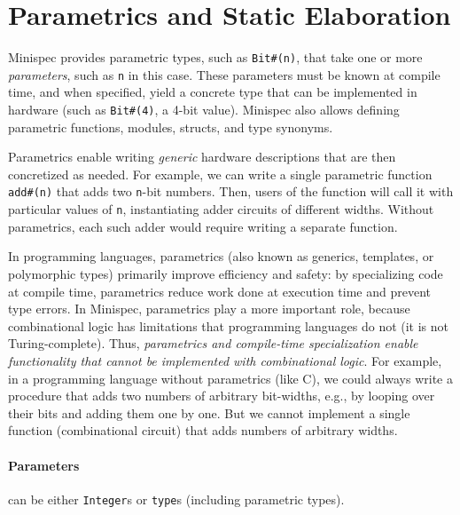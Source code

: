 \section{Parametrics and Static Elaboration}
\label{sec:parametrics}

Minispec provides parametric types, such as \texttt{Bit\#(n)},
that take one or more \emph{parameters}, such as \texttt{n} in this case.
These parameters must be known at compile time, and when specified,
yield a concrete type that can be implemented in hardware (such as \texttt{Bit\#(4)}, a 4-bit value).
Minispec also allows defining parametric functions, modules, structs, and type synonyms.

Parametrics enable writing \emph{generic} hardware descriptions
that are then concretized as needed. For example,
we can write a single parametric function \texttt{add\#(n)}
that adds two \texttt{n}-bit numbers.
Then, users of the function will call it with particular values of \texttt{n},
instantiating adder circuits of different widths.
Without parametrics, each such adder would require writing a separate function.

In programming languages, parametrics (also known as generics, templates, or polymorphic types)
primarily improve efficiency and safety: by specializing code at compile time,
parametrics reduce work done at execution time and prevent type errors.
In Minispec, parametrics play a more important role,
because combinational logic has limitations that programming languages do not (it is not Turing-complete).
Thus, \emph{parametrics and compile-time specialization enable functionality that cannot be implemented with combinational logic}.
For example, in a programming language without parametrics (like C),
we could always write a procedure that adds two numbers of arbitrary bit-widths,
e.g., by looping over their bits and adding them one by one.
But we cannot implement a single function (combinational circuit)
that adds numbers of arbitrary widths.


\paragraph{Parameters} can be either \texttt{Integer}s or \texttt{type}s (including parametric types).

